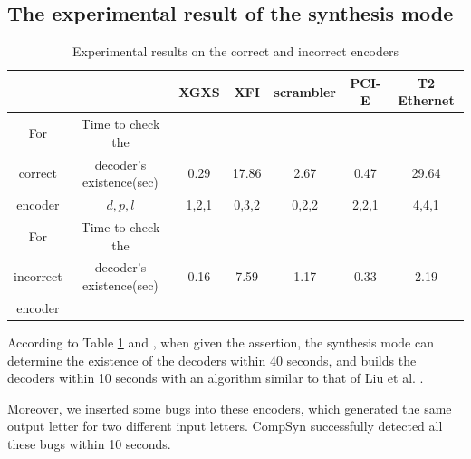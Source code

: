 \documentclass[runningheads,a4paper]{llncs}
\begin{document}
\subsection{The experimental result of the synthesis mode}
\begin{table}[t]
\centering
\caption{Experimental results on the correct and incorrect encoders}
\begin{tabular}{|c|c|c|c|c|c|c|}
\hline
&                                        &XGXS     &XFI       &scrambler     &PCI-E    &T2 Ethernet\\ \hline\hline
% 
For &Time to check the                         &&&&&\\
correct&decoder's existence(sec)                      &0.29     &17.86     &2.67      &0.47    &29.64\\\cline{2-7}
encoder&$d,p,l$                                 &1,2,1    &0,3,2     &0,2,2     &2,2,1   &4,4,1          \\ \hline\hline
For&Time to check the                          &&&&&\\
incorrect&decoder's existence(sec)             &0.16     &7.59     &1.17      &0.33    &2.19\\
encoder&                        &&&&&\\\hline

\end{tabular}\label{tab_prodes}
\end{table}

According to Table \ref{tab_prodes} and ,
when given the assertion,
the synthesis mode can determine the existence of the decoders within 40 seconds,
and builds the decoders within 10 seconds with an algorithm similar to that of Liu et al. .

Moreover,
we inserted some bugs into these encoders,
which generated the same output letter for two different input letters.
CompSyn successfully detected all these bugs within 10 seconds.
\end{document}
